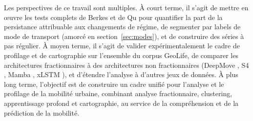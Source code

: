 Les perspectives de ce travail sont multiples. À court terme, il s'agit de mettre en \oe{}uvre les tests complets de Berkes et de Qu pour quantifier la part de la persistance attribuable aux changements de régime, de segmenter par labels de mode de transport (amorcé en section~\ref{sec:modes}), et de construire des séries à pas régulier. À moyen terme, il s'agit de valider expérimentalement le cadre de profilage et de cartographie sur l'ensemble du corpus GeoLife, de comparer les architectures fractionnaires à des architectures non fractionnaires (DeepMove \cite{feng2018}, S4 \cite{gu2022}, Mamba \cite{gu2023}, xLSTM \cite{beck2024}), et d'étendre l'analyse à d'autres jeux de données. À plus long terme, l'objectif est de construire un cadre unifié pour l'analyse et le profilage de la mobilité urbaine, combinant analyse fractionnaire, clustering, apprentissage profond et cartographie, au service de la compréhension et de la prédiction de la mobilité.

